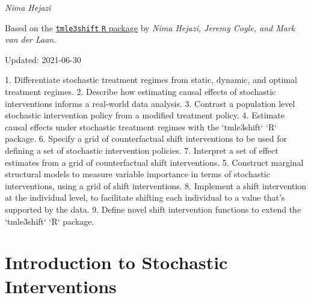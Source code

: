 \documentclass[12pt, krantz2,]{krantz}
\newcommand{\passthrough}[1]{#1}
\theoremstyle{definition}
\theoremstyle{definition}
\theoremstyle{definition}
\newcommand{\1}{\mathbbm{1}}
\begin{document}
\emph{Nima Hejazi}

Based on the \href{https://github.com/tlverse/tmle3shift}{\passthrough{\lstinline!tmle3shift!} \passthrough{\lstinline!R!} package}
by \emph{Nima Hejazi, Jeremy Coyle, and Mark van der Laan}.

Updated: 2021-06-30

\begin{VT1}



1. Differentiate stochastic treatment regimes from static, dynamic, and optimal
   treatment regimes.
2. Describe how estimating causal effects of stochastic interventions informs a
   real-world data analysis.
3. Contrast a population level stochastic intervention policy from a modified
   treatment policy.
4. Estimate causal effects under stochastic treatment regimes with the
   `tmle3shift` `R` package.
6. Specify a grid of counterfactual shift interventions to be used for defining
   a set of stochastic intervention policies.
7. Interpret a set of effect estimates from a grid of counterfactual shift
   interventions.
5. Construct marginal structural models to measure variable importance in terms
   of stochastic interventions, using a grid of shift interventions.
8. Implement a shift intervention at the individual level, to facilitate
   shifting each individual to a value that's supported by the data.
9. Define novel shift intervention functions to extend the `tmle3shift` `R`
   package.

\end{VT1}

\hypertarget{introduction-to-stochastic-interventions}{%
\section{Introduction to Stochastic Interventions}\label{introduction-to-stochastic-interventions}}
\end{document}
